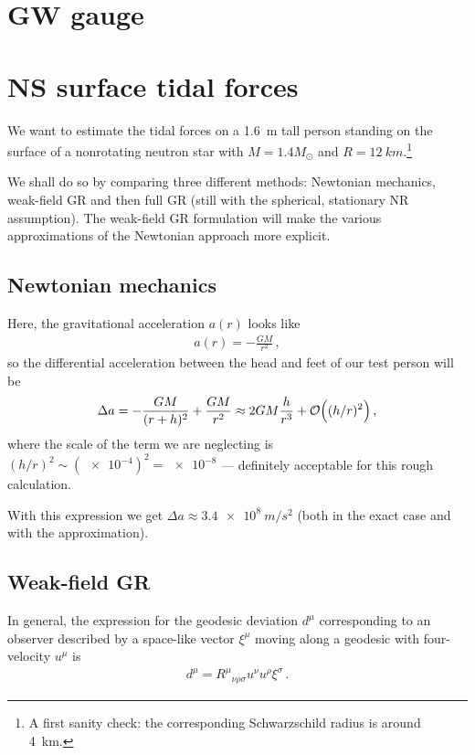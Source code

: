 \documentclass[main.tex]{subfiles}
\begin{document}
\section{GW gauge}

\section{NS surface tidal forces}

We want to estimate the tidal forces on a \SI{1.6}{m} tall person standing on the surface of a nonrotating neutron star with \(M = 1.4 M_{\odot}\) and \(R = \SI{12}{km}\).\footnote{A first sanity check: the corresponding Schwarzschild radius is around \SI{4}{km}.}

We shall do so by comparing three different methods: Newtonian mechanics, weak-field GR and then full GR (still with the spherical, stationary NR assumption).
The weak-field GR formulation will make the various approximations of the Newtonian approach more explicit. 

\subsection{Newtonian mechanics}

Here, the gravitational acceleration \(a (r)\) looks like 
%
\begin{align}
a (r) = - \frac{GM}{r^2}
\,,
\end{align}
%
so the differential acceleration between the head and feet of our test person will be 
%
\begin{align}
\Delta a = - \frac{GM}{(r + h)^2} + \frac{GM}{r^2} \approx 2GM \frac{h}{r^3} + \order{ (h / r)^2}
\,,
\end{align}
%
where the scale of the term we are neglecting is \((h / r)^2 \sim (\num{e-4})^2 = \num{e-8}\) --- definitely acceptable for this rough calculation.

With this expression we get \(\Delta a \approx \SI{3.4e8}{m/s^2}\) (both in the exact case and with the approximation). 

\subsection{Weak-field GR}

In general, the expression for the geodesic deviation \(d^{\mu }\) corresponding to an observer described by a space-like vector \(\xi^{\mu }\) moving along a geodesic with four-velocity \(u^{\mu }\)  is \cite[eq.\ 3.208]{carrollSpacetimeGeometryIntroduction2019}
%
\begin{align}
d^{\mu } = R^{\mu }{}_{\nu \rho \sigma  } u^{\nu } u^{\rho } \xi^{\sigma }
\,.
\end{align}
\end{document}
